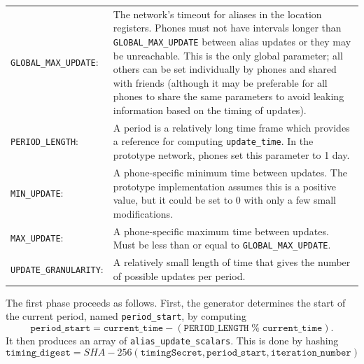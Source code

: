 \documentclass[11pt]{article}
\begin{document}
\begin{center}
\begin{tabular}{p{4cm} p{9cm} }
\texttt{GLOBAL_MAX_UPDATE}: &  
			The network's timeout for aliases in the location registers. Phones must not have intervals longer than \texttt{GLOBAL_MAX_UPDATE} between alias updates or they may be unreachable. This is the only global parameter; all others can be set individually by phones and shared with friends (although it may be preferable for all phones to share the same parameters to avoid leaking information based on the timing of updates). \\[0.5cm]
\texttt{PERIOD_LENGTH}: &
			A period is a relatively long time frame which provides a reference for computing \texttt{update_time}. In the prototype network, phones set this parameter to 1 day. \\[0.5cm]
\texttt{MIN_UPDATE}: &
			A phone-specific minimum time between updates. The prototype implementation assumes this is a positive value, but it could be set to 0 with only a few small modifications. \\[0.5cm]
\texttt{MAX_UPDATE}: &
			A phone-specific maximum time between updates. Must be less than or equal to \texttt{GLOBAL_MAX_UPDATE}. \\[0.5cm]
\texttt{UPDATE_GRANULARITY}: & 
	A relatively small length of time that gives the number of possible updates per period. 
\end{tabular}
\end{center}

	The first phase proceeds as follows. First, the generator determines the start of the current period, named \texttt{period_start}, by computing 
\begin{equation*}
	\texttt{period_start} = \texttt{current_time} - (\texttt{PERIOD_LENGTH}\; \% \;\texttt{current_time}). 
\end{equation*}
It then produces an array of \texttt{alias_update_scalars}. This is done by hashing 
\begin{equation*}
	\texttt{timing_digest} = SHA-256(\texttt{timingSecret}, \texttt{period_start}, \texttt{iteration_number})
\end{equation*}
\end{document}
